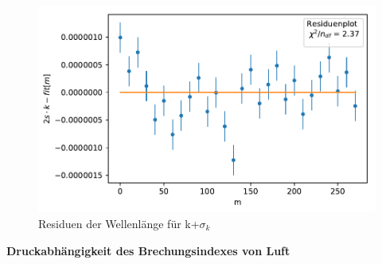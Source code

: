 \documentclass[12pt,a4paper]{article}
\begin{document}
\begin{figure}[H]
	\centering
	\includegraphics[scale=1.0]{Python/Lambdagruen_Residuen3.pdf}
	\caption{Residuen der Wellenlänge für k+$\sigma_k$}
\end{figure}
\newpage
\textbf{Druckabhängigkeit des Brechungsindexes von Luft}
\end{document}
